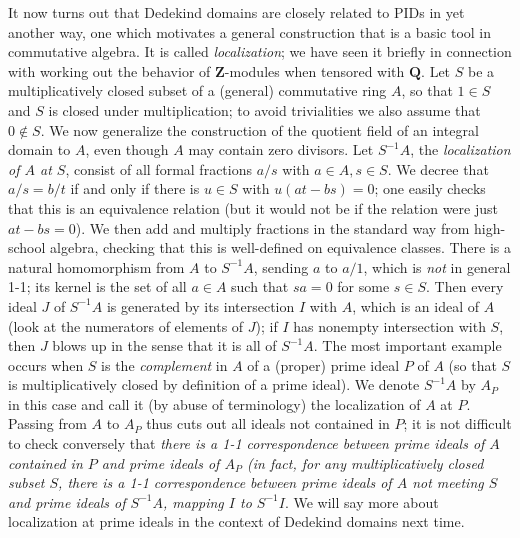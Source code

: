 \documentclass[10pt]{article}
\begin{document}
It now turns out that Dedekind domains are closely related to PIDs in
yet another way, one which motivates a general construction that is a
basic tool in commutative algebra. It is called {\sl localization}; we
have seen it briefly in connection with working out the behavior of
$\mathbf Z$-modules when tensored with $\mathbf Q$. Let $S$ be a
multiplicatively closed subset of a (general) commutative ring $A$, so
that $1\in S$ and $S$ is closed under multiplication; to avoid
trivialities we also assume that $0\notin S$. We now generalize the
construction of the quotient field of an integral domain to $A$, even
though $A$ may contain zero divisors. Let $S^{-1}A$, the {\sl
  localization of $A$ at $S$}, consist of all formal fractions $a/s$
with $a\in A, s\in S$. We decree that $a/s = b/t$ if and only if there
is $u\in S$ with $u(at - bs) = 0$; one easily checks that this is an
equivalence relation (but it would not be if the relation were just $at
- bs = 0$). We then add and multiply fractions in the standard way from
high-school algebra, checking that this is well-defined on equivalence
classes. There is a natural homomorphism from $A$ to $S^{-1}A$, sending
$a$ to $a/1$, which is {\sl not} in general 1-1; its kernel is the set
of all $a\in A$ such that $sa = 0$ for some $s\in S$. Then every ideal
$J$ of $S^{-1}A$ is generated by its intersection $I$ with $A$, which is
an ideal of $A$ (look at the numerators of elements of $J$); if $I$ has
nonempty intersection with $S$, then $J$ blows up in the sense that it
is all of $S^{-1}A$. The most important example occurs when $S$ is the
{\sl complement} in $A$ of a (proper) prime ideal $P$ of $A$ (so that
$S$ is multiplicatively closed by definition of a prime ideal). We
denote $S^{-1}A$ by $A_P$ in this case and call it (by abuse of
terminology) the localization of $A$ at $P$. Passing from $A$ to $A_P$
thus cuts out all ideals not contained in $P$; it is not difficult to
check conversely that {\sl there is a 1-1 correspondence between prime
  ideals of $A$ contained in $P$ and prime ideals of $A_P$ (in fact, for
  any multiplicatively closed subset $S$, there is a 1-1 correspondence
  between prime ideals of $A$ not meeting $S$ and prime ideals of
  $S^{-1}A$, mapping $I$ to $S^{-1}I$}. We will say more about
localization at prime ideals in the context of Dedekind domains next
time.
\end{document}
